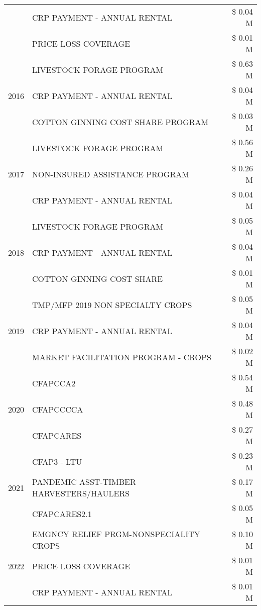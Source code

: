 \begin{tabular}{llr}
 & CRP PAYMENT - ANNUAL RENTAL & \$ 0.04 M \\
 & PRICE LOSS COVERAGE & \$ 0.01 M \\
\cline{1-3}
\multirow[t]{3}{*}{2016} & LIVESTOCK FORAGE PROGRAM & \$ 0.63 M \\
 & CRP PAYMENT - ANNUAL RENTAL & \$ 0.04 M \\
 & COTTON GINNING COST SHARE PROGRAM & \$ 0.03 M \\
\cline{1-3}
\multirow[t]{3}{*}{2017} & LIVESTOCK FORAGE PROGRAM & \$ 0.56 M \\
 & NON-INSURED ASSISTANCE PROGRAM & \$ 0.26 M \\
 & CRP PAYMENT - ANNUAL RENTAL & \$ 0.04 M \\
\cline{1-3}
\multirow[t]{3}{*}{2018} & LIVESTOCK FORAGE PROGRAM & \$ 0.05 M \\
 & CRP PAYMENT - ANNUAL RENTAL & \$ 0.04 M \\
 & COTTON GINNING COST SHARE & \$ 0.01 M \\
\cline{1-3}
\multirow[t]{3}{*}{2019} & TMP/MFP 2019 NON SPECIALTY CROPS & \$ 0.05 M \\
 & CRP PAYMENT - ANNUAL RENTAL & \$ 0.04 M \\
 & MARKET FACILITATION PROGRAM - CROPS & \$ 0.02 M \\
\cline{1-3}
\multirow[t]{3}{*}{2020} & CFAPCCA2 & \$ 0.54 M \\
 & CFAPCCCCA & \$ 0.48 M \\
 & CFAPCARES & \$ 0.27 M \\
\cline{1-3}
\multirow[t]{3}{*}{2021} & CFAP3 - LTU & \$ 0.23 M \\
 & PANDEMIC ASST-TIMBER HARVESTERS/HAULERS & \$ 0.17 M \\
 & CFAPCARES2.1 & \$ 0.05 M \\
\cline{1-3}
\multirow[t]{3}{*}{2022} & EMGNCY RELIEF PRGM-NONSPECIALITY CROPS & \$ 0.10 M \\
 & PRICE LOSS COVERAGE & \$ 0.01 M \\
 & CRP PAYMENT - ANNUAL RENTAL & \$ 0.01 M \\
\cline{1-3}
\bottomrule
\end{tabular}
